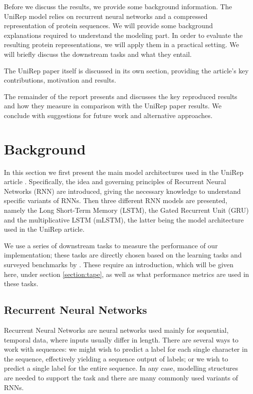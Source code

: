 \documentclass[a4paper,12pt]{article}
\begin{document}
Before we discuss the results, we provide some background information. The UniRep model relies on recurrent neural networks and a compressed representation of protein sequences. We will provide some background explanations required to understand the modeling part. In order to evaluate the resulting protein representations, we will apply them in a practical setting. We will briefly discuss the downstream tasks and what they entail.

The UniRep paper itself is discussed in its own section, providing the article's key contributions, motivation and results.

The remainder of the report presents and discusses the key reproduced results and how they measure in comparison with the UniRep paper results. We conclude with suggestions for future work and alternative approaches.


\clearpage
\section{Background}
\label{section:background}

In this section we first present the main model architectures used in the UniRep article \cite{alley2019unified}. Specifically, the idea and governing principles of Recurrent Neural Networks (RNN) are introduced, giving the necessary knowledge to understand specific variants of RNNs. Then three different RNN models are presented, namely the Long Short-Term Memory (LSTM), the Gated Recurrent Unit (GRU) and the multiplicative LSTM (mLSTM), the latter being the model architecture used in the UniRep article.

We use a series of downstream tasks to measure the performance of our implementation; these tasks are directly chosen based on the learning tasks and surveyed benchmarks by \cite{tape2019}. These require an introduction, which will be given here, under section \ref{section:tape}, as well as what performance metrics are used in these tasks.

\subsection{Recurrent Neural Networks}
Recurrent Neural Networks are neural networks used mainly for sequential, temporal data, where inputs usually differ in length. There are several ways to work with sequences: we might wish to predict a label for each single character in the sequence, effectively yielding a sequence output of labels; or we wish to predict a single label for the entire sequence. In any case, modelling structures are needed to support the task and there are many commonly used variants of RNNs.
\end{document}
